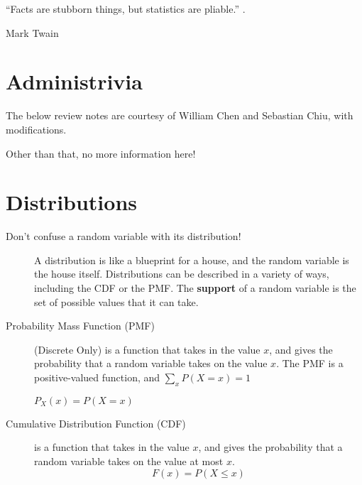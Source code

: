 \documentclass[11pt]{article}
\begin{document}

\setlength{\epigraphwidth}{.6\textwidth}
\epigraph{“Facts are stubborn things, but statistics are pliable.” .}{Mark Twain}

\section*{Administrivia}
The below review notes are courtesy of William Chen and Sebastian Chiu, with modifications.

Other than that, no more information here!

\section*{Distributions}
\begin{description}

\item[Don't confuse a random variable with its distribution!] A distribution is like a blueprint for a house, and the random variable is the house itself. Distributions can be described in a variety of ways, including the CDF or the PMF. The \textbf{support} of a random variable is the set of possible values that it can take.


\item[Probability Mass Function (PMF)] (Discrete Only) is a function that takes in the value $x$, and gives the probability that a random variable takes on the value $x$. The PMF is a positive-valued function, and $\sum_x P(X=x) = 1$
\begin{center}
$P_X(x) = P(X=x)$
\end{center}

\item[Cumulative Distribution Function (CDF)] is a function that takes in the value $x$, and gives the probability that a random variable takes on the value at most $x$.
\[F(x) = P(X \leq x)\]


\end{description}
\end{document}
